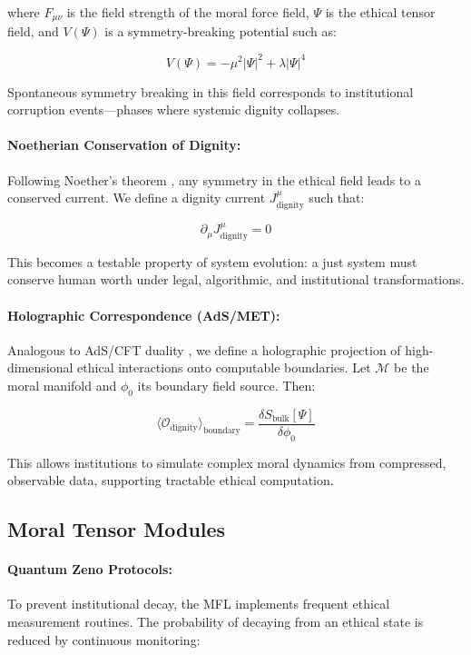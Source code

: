 \documentclass{article}
\theoremstyle{plain}
\theoremstyle{claimstyle}
\begin{document}
where \(F_{\mu\nu}\) is the field strength of the moral force field, \(\Psi\) is the ethical tensor field, and \(V(\Psi)\) is a symmetry-breaking potential such as:

\[
V(\Psi) = -\mu^2|\Psi|^2 + \lambda|\Psi|^4
\]

Spontaneous symmetry breaking in this field corresponds to institutional corruption events—phases where systemic dignity collapses.

\paragraph{Noetherian Conservation of Dignity:}

Following Noether’s theorem \citep{Noether1918}, any symmetry in the ethical field leads to a conserved current. We define a dignity current \(J^\mu_{\text{dignity}}\) such that:

\[
\partial_\mu J^\mu_{\text{dignity}} = 0
\]

This becomes a testable property of system evolution: a just system must conserve human worth under legal, algorithmic, and institutional transformations.

\paragraph{Holographic Correspondence (AdS/MET):}

Analogous to AdS/CFT duality \citep{Maldacena1998}, we define a holographic projection of high-dimensional ethical interactions onto computable boundaries. Let \(\mathcal{M}\) be the moral manifold and \(\phi_0\) its boundary field source. Then:

\[
\langle \mathcal{O}_{\text{dignity}} \rangle_{\text{boundary}} = \frac{\delta S_{\text{bulk}}[\Psi]}{\delta \phi_0}
\]

This allows institutions to simulate complex moral dynamics from compressed, observable data, supporting tractable ethical computation.

\subsection{Moral Tensor Modules}

\paragraph{Quantum Zeno Protocols:}

To prevent institutional decay, the MFL implements frequent ethical measurement routines. The probability of decaying from an ethical state is reduced by continuous monitoring:
\end{document}
